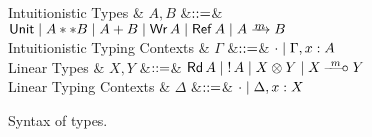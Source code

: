 \begin{figure*}
  \begin{grammar}
    Intuitionistic Types
    & $A,B$
    &$\mathrel{::=}$& $\tyUnit \bnfalt \tyProd{A}{B} \bnfalt \tySum{A}{B} \bnfalt
    \tyWr{A} \bnfalt \tyRef{A} \bnfalt \tyArr{A}{\footnotesize $m$}{B}$
    \\
    Intuitionistic Typing Contexts
    & $\Gamma$
    &$\mathrel{::=}$& $\cdot \mathrel{\mid} \Gamma,x:A$
    \\
    Linear Types
    & $X,Y$
    &$\mathrel{::=}$& $\tyRd{A} \bnfalt \tyBang{A} \bnfalt \tyTensor{X}{Y} \bnfalt
    \tyLolli{X}{\footnotesize m}{Y}$
    \\
    Linear Typing Contexts
    & $\Delta$
    &$\mathrel{::=}$& $\cdot \mathrel{\mid} \Delta,x:X$
  \end{grammar}
\caption{Syntax of types.}
\label{fig:syntax--types}
\end{figure*}
